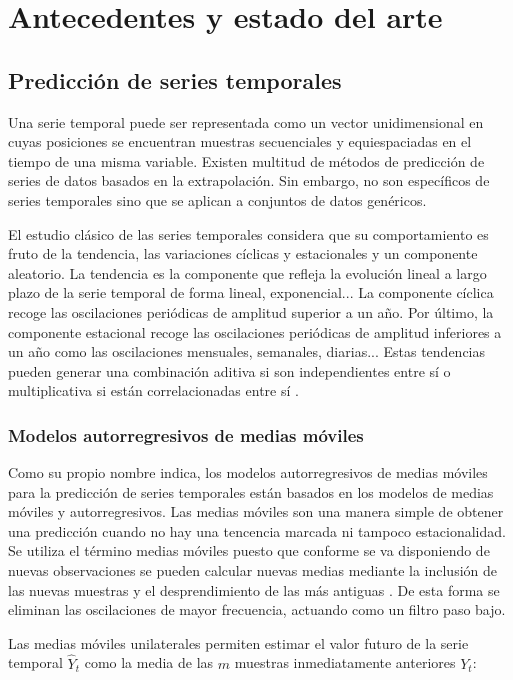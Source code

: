 \section{Antecedentes y estado del arte}
\label{cap2:arte}
\subsection{Predicción de series temporales}
Una serie temporal puede ser representada como un vector unidimensional en cuyas posiciones se encuentran muestras secuenciales y equiespaciadas en el tiempo de una misma variable. Existen multitud de métodos de predicción de series de datos basados en la extrapolación. Sin embargo, no son específicos de series temporales sino que se aplican a conjuntos de datos genéricos.

El estudio clásico de las series temporales considera que su comportamiento es fruto de la tendencia, las variaciones cíclicas y estacionales y un componente aleatorio. La tendencia es la componente que refleja la evolución lineal a largo plazo de la serie temporal de forma lineal, exponencial... La componente cíclica recoge las oscilaciones periódicas de amplitud superior a un año. Por último, la componente estacional recoge las oscilaciones periódicas de amplitud inferiores a un año como las oscilaciones mensuales, semanales, diarias... Estas tendencias pueden generar una combinación aditiva si son independientes entre sí o multiplicativa si están correlacionadas entre sí \cite{seriestemporales2}.

\subsubsection{Modelos autorregresivos de medias móviles}
Como su propio nombre indica, los modelos autorregresivos de medias móviles para la predicción de series temporales están basados en los modelos de medias móviles y autorregresivos. Las medias móviles son una manera simple de obtener una predicción cuando no hay una tencencia marcada ni tampoco estacionalidad. Se utiliza el término medias móviles puesto que conforme se va disponiendo de nuevas observaciones se pueden calcular nuevas medias mediante la inclusión de las nuevas muestras y el desprendimiento de las más antiguas \cite{seriestemporales}. De esta forma se eliminan las oscilaciones de mayor frecuencia, actuando como un filtro paso bajo.

Las medias móviles unilaterales permiten estimar el valor futuro de la serie temporal $\hat{Y}_t$ como la media de las $m$ muestras inmediatamente anteriores $Y_t$:

